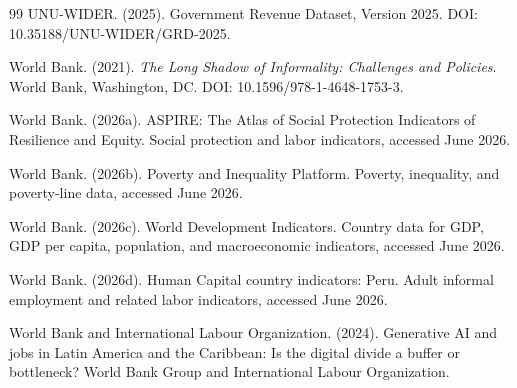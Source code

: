 \documentclass[11pt,a4paper]{article}
\begin{document}
\begin{thebibliography}{99}
UNU-WIDER. (2025).
\newblock Government Revenue Dataset, Version 2025.
\newblock DOI: 10.35188/UNU-WIDER/GRD-2025.

World Bank. (2021).
\newblock \emph{The Long Shadow of Informality: Challenges and Policies}.
\newblock World Bank, Washington, DC. DOI: 10.1596/978-1-4648-1753-3.


World Bank. (2026a).
\newblock ASPIRE: The Atlas of Social Protection Indicators of Resilience and Equity.
\newblock Social protection and labor indicators, accessed June 2026.

World Bank. (2026b).
\newblock Poverty and Inequality Platform.
\newblock Poverty, inequality, and poverty-line data, accessed June 2026.

World Bank. (2026c).
\newblock World Development Indicators.
\newblock Country data for GDP, GDP per capita, population, and macroeconomic indicators, accessed June 2026.

World Bank. (2026d).
\newblock Human Capital country indicators: Peru.
\newblock Adult informal employment and related labor indicators, accessed June 2026.

World Bank and International Labour Organization. (2024).
\newblock Generative AI and jobs in Latin America and the Caribbean: Is the digital divide a buffer or bottleneck?
\newblock World Bank Group and International Labour Organization.

\end{thebibliography}
\end{document}
